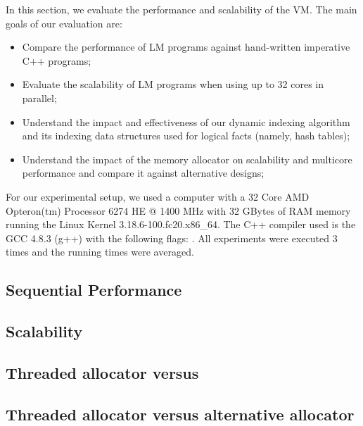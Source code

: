 In this section, we evaluate the performance and scalability of the VM. The main
goals of our evaluation are:

\begin{itemize}
   \item Compare the performance of LM programs against hand-written
      imperative C++ programs;
   \item Evaluate the scalability of LM programs when using up to 32 cores
      in parallel;
   \item Understand the impact and effectiveness of our dynamic indexing
      algorithm and its indexing data structures used for logical facts (namely,
      hash tables);
   \item Understand the impact of the memory allocator on scalability and
      multicore performance and compare it against alternative designs;
\end{itemize}

For our experimental setup, we used a computer with a 32 Core AMD
Opteron(tm) Processor 6274 HE $@$ 1400 MHz with 32 GBytes of RAM memory running
the Linux Kernel 3.18.6-100.fc20.x86\_64. The C++ compiler used is the GCC
4.8.3 (g++) with the following  flags: .  All experiments were executed 3 times and the running times
were averaged.

\subsection{Sequential Performance}\label{section:implementation:performance}


\subsection{Scalability}


\clearpage

\subsection{Threaded allocator versus }


\subsection{Threaded allocator versus alternative allocator}\label{section:implementation:alternative_allocator}

